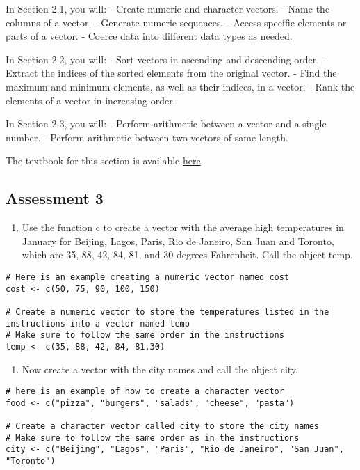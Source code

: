 \documentclass[
]{article}
\providecommand{\tightlist}{%
  \setlength{\itemsep}{0pt}\setlength{\parskip}{0pt}}
\begin{document}
In Section 2.1, you will: - Create numeric and character vectors. - Name
the columns of a vector. - Generate numeric sequences. - Access specific
elements or parts of a vector. - Coerce data into different data types
as needed.

In Section 2.2, you will: - Sort vectors in ascending and descending
order. - Extract the indices of the sorted elements from the original
vector. - Find the maximum and minimum elements, as well as their
indices, in a vector. - Rank the elements of a vector in increasing
order.

In Section 2.3, you will: - Perform arithmetic between a vector and a
single number. - Perform arithmetic between two vectors of same length.

The textbook for this section is available
\href{https://rafalab.github.io/dsbook/r-basics.html\#vectors}{here}

\hypertarget{assessment-3}{%
\subsection{Assessment 3}\label{assessment-3}}

\begin{enumerate}
\def\labelenumi{\arabic{enumi}.}
\tightlist
\item
  Use the function c to create a vector with the average high
  temperatures in January for Beijing, Lagos, Paris, Rio de Janeiro, San
  Juan and Toronto, which are 35, 88, 42, 84, 81, and 30 degrees
  Fahrenheit. Call the object temp.
\end{enumerate}

\begin{verbatim}
# Here is an example creating a numeric vector named cost
cost <- c(50, 75, 90, 100, 150)

# Create a numeric vector to store the temperatures listed in the instructions into a vector named temp
# Make sure to follow the same order in the instructions
temp <- c(35, 88, 42, 84, 81,30)
\end{verbatim}

\begin{enumerate}
\def\labelenumi{\arabic{enumi}.}
\setcounter{enumi}{1}
\tightlist
\item
  Now create a vector with the city names and call the object city.
\end{enumerate}

\begin{verbatim}
# here is an example of how to create a character vector
food <- c("pizza", "burgers", "salads", "cheese", "pasta")

# Create a character vector called city to store the city names
# Make sure to follow the same order as in the instructions
city <- c("Beijing", "Lagos", "Paris", "Rio de Janeiro", "San Juan", "Toronto")
\end{verbatim}
\end{document}
